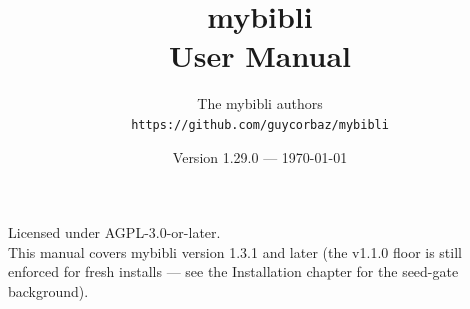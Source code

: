 \documentclass[a4paper,11pt,oneside]{book}
\title{\Huge\bfseries mybibli\\[6pt]\Large User Manual}
\author{The mybibli authors\\\small \texttt{https://github.com/guycorbaz/mybibli}}
\date{Version 1.29.0 — \today}
\begin{document}
\frontmatter
\maketitle

\begin{center}
\vspace*{2cm}
\small
Licensed under AGPL-3.0-or-later.\\
This manual covers mybibli version 1.3.1 and later (the v1.1.0 floor is still enforced for fresh installs — see the Installation chapter for the seed-gate background).
\end{center}

\tableofcontents

\mainmatter

















\backmatter
\cleardoublepage
{}
\label{index}
\printindex
\end{document}
